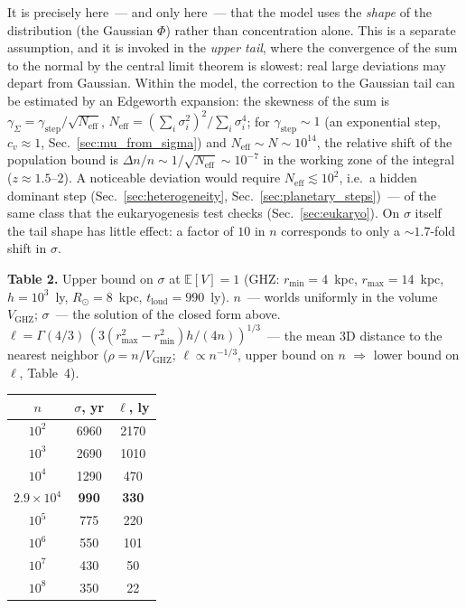 \documentclass[11pt,a4paper]{article}
\begin{document}
It is precisely here~--- and only here~--- that the model uses the \emph{shape} of the distribution (the Gaussian $\Phi$) rather than concentration alone. This is a separate assumption, and it is invoked in the \emph{upper tail}, where the convergence of the sum to the normal by the central limit theorem is slowest: real large deviations may depart from Gaussian. Within the model, the correction to the Gaussian tail can be estimated by an Edgeworth expansion: the skewness of the sum is $\gamma_\Sigma=\gamma_{\text{step}}/\sqrt{N_{\mathrm{eff}}}$, $N_{\mathrm{eff}}=(\sum_i\sigma_i^2)^2/\sum_i\sigma_i^4$; for $\gamma_{\text{step}}\sim1$ (an exponential step, $c_v\approx1$, Sec.~\ref{sec:mu_from_sigma}) and $N_{\mathrm{eff}}\sim N\sim10^{14}$, the relative shift of the population bound is $\Delta n/n\sim1/\sqrt{N_{\mathrm{eff}}}\sim10^{-7}$ in the working zone of the integral ($z\approx1.5$--$2$). A noticeable deviation would require $N_{\mathrm{eff}}\lesssim10^2$, i.e.\ a hidden dominant step (Sec.~\ref{sec:heterogeneity}, Sec.~\ref{sec:planetary_steps})~--- of the same class that the eukaryogenesis test checks (Sec.~\ref{sec:eukaryo}). On $\sigma$ itself the tail shape has little effect: a factor of $10$ in $n$ corresponds to only a $\sim1.7$-fold shift in $\sigma$.

\begin{center}
\textbf{Table 2.} Upper bound on $\sigma$ at $\mathbb{E}[V]=1$ (GHZ: $r_{\min}=4$~kpc, $r_{\max}=14$~kpc, $h = 10^3$~ly, $R_\odot=8$~kpc, $t_{\mathrm{loud}} = 990$~ly). $n$~--- worlds uniformly in the volume $V_{\mathrm{GHZ}}$; $\sigma$~--- the solution of the closed form above. $\ell = \Gamma(4/3)\,(3(r_{\max}^2-r_{\min}^2)h/(4n))^{1/3}$~--- the mean 3D distance to the nearest neighbor ($\rho = n/V_{\mathrm{GHZ}}$; $\ell \propto n^{-1/3}$, upper bound on $n$ $\Rightarrow$ lower bound on $\ell$, Table~4).

\medskip
\begin{tabular}{ccc}
\toprule
$n$ & $\sigma$, yr & $\ell$, ly \\
\midrule
$10^2$ & 6960 & 2170 \\
$10^3$ & 2690 & 1010 \\
$10^4$ & 1290 & 470 \\
\textbf{$2.9 \times 10^4$} & \textbf{990} & \textbf{330} \\
$10^5$ & 775 & 220 \\
$10^6$ & 550 & 101 \\
$10^7$ & 430 & 50 \\
$10^8$ & 350 & 22 \\
\bottomrule
\end{tabular}
\end{center}
\end{document}

